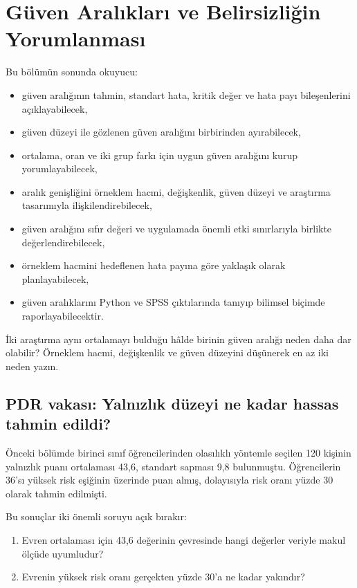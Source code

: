 \chapter{Güven Aralıkları ve Belirsizliğin Yorumlanması}

\begin{hedefler}
Bu bölümün sonunda okuyucu:
\begin{itemize}
  \item güven aralığının tahmin, standart hata, kritik değer ve hata payı bileşenlerini açıklayabilecek,
  \item güven düzeyi ile gözlenen güven aralığını birbirinden ayırabilecek,
  \item ortalama, oran ve iki grup farkı için uygun güven aralığını kurup yorumlayabilecek,
  \item aralık genişliğini örneklem hacmi, değişkenlik, güven düzeyi ve araştırma tasarımıyla ilişkilendirebilecek,
  \item güven aralığını sıfır değeri ve uygulamada önemli etki sınırlarıyla birlikte değerlendirebilecek,
  \item örneklem hacmini hedeflenen hata payına göre yaklaşık olarak planlayabilecek,
  \item güven aralıklarını Python ve SPSS çıktılarında tanıyıp bilimsel biçimde raporlayabilecektir.
\end{itemize}
\end{hedefler}

\begin{hazirlik}
İki araştırma aynı ortalamayı bulduğu hâlde birinin güven aralığı neden daha
dar olabilir? Örneklem hacmi, değişkenlik ve güven düzeyini düşünerek en az iki
neden yazın.
\end{hazirlik}

\section{PDR vakası: Yalnızlık düzeyi ne kadar hassas tahmin edildi?}

Önceki bölümde birinci sınıf öğrencilerinden olasılıklı yöntemle seçilen 120
kişinin yalnızlık puanı ortalaması 43,6, standart sapması 9,8 bulunmuştu.
Öğrencilerin 36'sı yüksek risk eşiğinin üzerinde puan almış, dolayısıyla risk
oranı yüzde 30 olarak tahmin edilmişti.

Bu sonuçlar iki önemli soruyu açık bırakır:

\begin{enumerate}
  \item Evren ortalaması için 43,6 değerinin çevresinde hangi değerler veriyle makul ölçüde uyumludur?
  \item Evrenin yüksek risk oranı gerçekten yüzde 30'a ne kadar yakındır?
\end{enumerate}

